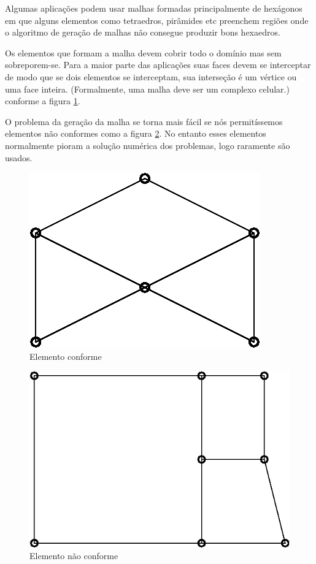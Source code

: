 Algumas aplicações podem usar malhas formadas principalmente de hexágonos em que alguns elementos como tetraedros, pirâmides etc preenchem regiões onde o algoritmo de geração de malhas não consegue produzir bons hexaedros.

Os elementos que formam a malha devem cobrir todo o domínio mas sem sobreporem-se. Para a maior parte das aplicações suas faces devem se interceptar de modo que se dois elementos se interceptam, sua interseção é um vértice ou uma face inteira. (Formalmente, uma malha deve ser um complexo celular.) conforme a figura \ref{fig:celula_correta}.

O problema da geração da malha se torna mais fácil se nós permitíssemos elementos não conformes como a figura \ref{fig:celula_errada}. No entanto esses elementos normalmente pioram a solução numérica dos problemas, logo raramente são usados.

\begin{figure}
    \centering
    \includegraphics{fig/celula_correta.eps}
    \caption[Elemento conforme]{Elemento conforme}
    \label{fig:celula_correta}
\end{figure}


\begin{figure}
    \centering
    \includegraphics{fig/celula_errada.eps}
    \caption[Elemento não conforme]{Elemento não conforme}
    \label{fig:celula_errada}
\end{figure}

